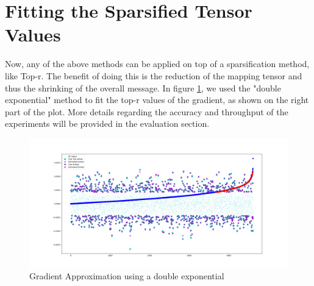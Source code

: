     \section{Fitting the Sparsified Tensor Values}

    
    Now, any of the above methods can be applied on top of a sparsification method, like Top-r. The benefit of doing this is the reduction of the mapping tensor and thus the shrinking of the overall message.
    In figure \ref{topk-resnet-19gradient}, we used the "double exponential" method to fit the top-r values of the gradient, as shown on the right part of the plot.
    More details regarding the accuracy and throughput of the experiments will be provided in the evaluation section.
    
    \begin{figure}[h]
    \centering
    \includegraphics[width=1\textwidth]{thesis/figures/topk-resnet-19gradient.png}
    \caption{Gradient Approximation using a double exponential}
    \label{topk-resnet-19gradient}
    \end{figure}
    
